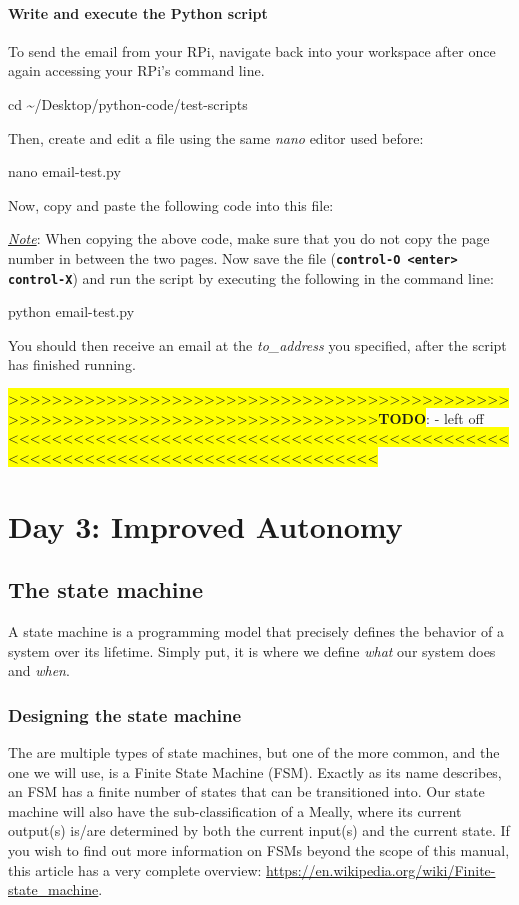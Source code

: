 \documentclass{article}
\newcommand*{\myfont}{\fontfamily{pcr}\selectfont}
\newcommand{\codeb}[2]{
  \begin{tcolorbox}[width=\textwidth,colback={SpringGreen},title={#1},colbacktitle=darkgreen,coltitle=SpringGreen]
    \myfont
    #2
  \end{tcolorbox}
} %
\newcommand{\todo}[1]{\newline\noindent\colorbox{Yellow}{>>>>>>>>>>>>>>>>>>>>>>>>>>>>>>>>>>>>>>>>>>>>>>>>>>>>>>>>>>>>>>>>>>>>>>>>>>>>>>>>}\newline\colorbox{Yellow}{\textbf{TODO}}: - #1 \newline \colorbox{Yellow}{<<<<<<<<<<<<<<<<<<<<<<<<<<<<<<<<<<<<<<<<<<<<<<<<<<<<<<<<<<<<<<<<<<<<<<<<<<<<<<<<}\newline}
\newcommand{\note}[1]{\underline{\textit{Note}}: #1}
\begin{document}
    \paragraph{Write and execute the Python script}
    To send the email from your RPi, navigate back into your workspace after once again accessing your RPi's command line.
    \codeb{Navigate to your workspace}
    {
      cd \textasciitilde/Desktop/python-code/test-scripts
    }
    Then, create and edit a file using the same \textit{nano} editor used before:
    \codeb{Create email Python testing script file}
    {
      nano email-test.py
    }
    Now, copy and paste the following code into this file:
    
    \note{When copying the above code, make sure that you do not copy the page number in between the two pages.}
    \newline
    \newline
    \noindent
    Now save the file (\textbf{\texttt{control-O <enter> control-X}}) and run the script by executing the following in the command line:
    \codeb{Run the test script for email}{
      python email-test.py
    }
    You should then receive an email at the \textit{to\_address} you specified, after the script has finished running.

    \todo{left off}
\section{Day 3: Improved Autonomy}
\subsection{The state machine}
A state machine is a programming model that precisely defines the behavior of a system over its lifetime. Simply put, it is where we define \textit{what} our system does and \textit{when}.
  \subsubsection{Designing the state machine}
  The are multiple types of state machines, but one of the more common, and the one we will use, is a Finite State Machine (FSM). Exactly as its name describes, an FSM has a finite number of states that can be transitioned into. Our state machine will also have the sub-classification of a Meally, where its current output(s) is/are determined by both the current input(s) and the current state. If you wish to find out more information on FSMs beyond the scope of this manual, this article has a very complete overview: \url{https://en.wikipedia.org/wiki/Finite-state_machine}.
\end{document}
